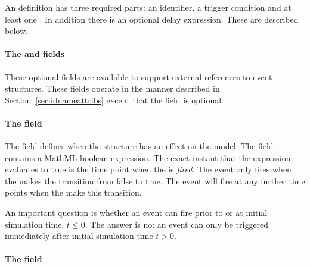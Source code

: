 \subsubsection{}
\label{sec:event-sboterm}

An \Event definition has three required parts: an identifier, a
trigger condition and at least one \EventAssignment. In addition
there is an optional delay expression.  These are described below.


\paragraph{The  and  fields}
\label{sec:event-id-name}

These optional fields are available to support external references
to event structures.  These fields operate in the manner described
in Section~\ref{sec:idnameattribs} except that the 
field is optional.


\paragraph{The  field}
\label{sec:event-trigger}

The  field defines when the \Event structure has an
effect on the model.  The  field contains a MathML
boolean expression.  The exact instant that the expression
evaluates to true is the time point when the \Event is
\emph{fired}.  The event only fires when the  makes
the transition from false to true.  The event will fire at any
further time points when the  make this transition.

An important question is whether an event can fire prior to or at
initial simulation time, \ie $t \leq 0$.  The answer is no: an
event can only be triggered immediately after initial simulation
time \ie $t > 0$.




\paragraph{The  field}
\label{sec:event-delay}

